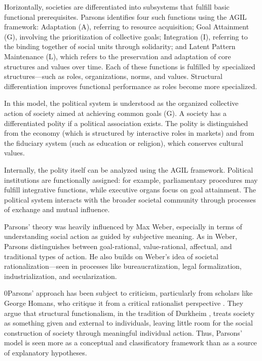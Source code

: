 \documentclass[12pt]{article}
\begin{document}
Horizontally, societies are differentiated into subsystems that fulfill basic functional prerequisites. Parsons identifies four such functions using the AGIL framework: Adaptation (A), referring to resource acquisition; Goal Attainment (G), involving the prioritization of collective goals; Integration (I), referring to the binding together of social units through solidarity; and Latent Pattern Maintenance (L), which refers to the preservation and adaptation of core structures and values over time. Each of these functions is fulfilled by specialized structures—such as roles, organizations, norms, and values. Structural differentiation improves functional performance as roles become more specialized.

In this model, the political system is understood as the organized collective action of society aimed at achieving common goals (G). A society has a differentiated polity if a political association exists. The polity is distinguished from the economy (which is structured by interactive roles in markets) and from the fiduciary system (such as education or religion), which conserves cultural values.

Internally, the polity itself can be analyzed using the AGIL framework. Political institutions are functionally assigned: for example, parliamentary procedures may fulfill integrative functions, while executive organs focus on goal attainment. The political system interacts with the broader societal community through processes of exchange and mutual influence.

Parsons’ theory was heavily influenced by Max Weber, especially in terms of understanding social action as guided by subjective meaning. As in Weber, Parsons distinguishes between goal-rational, value-rational, affectual, and traditional types of action. He also builds on Weber’s idea of societal rationalization—seen in processes like bureaucratization, legal formalization, industrialization, and secularization.

0Parsons’ approach has been subject to criticism, particularly from scholars like  George Homans, who critique it from a critical rationalist perspective \citep{homans1964bringing}. They argue that structural functionalism, in the tradition of Durkheim \citep{durkheim1892division}, treats society as something given and external to individuals, leaving little room for the social construction of society through meaningful individual action. Thus, Parsons' model is seen more as a conceptual and classificatory framework than as a source of explanatory hypotheses.
\end{document}
